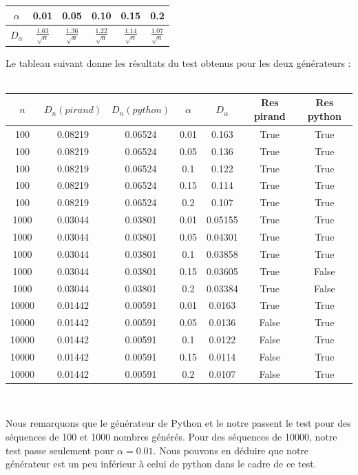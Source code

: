 \documentclass[10pt,a4paper]{article}
\begin{document}
\begin{center}
\begin{tabular}{|c|c|c|c|c|c|}
\hline
$\alpha$ &0.01& 0.05& 0.10& 0.15& 0.2\\
\hline
$D_\alpha$ & $\frac{1.63}{\sqrt{n}}$ & $\frac{1.36}{\sqrt{n}}$ & $\frac{1.22}{\sqrt{n}}$ & $\frac{1.14}{\sqrt{n}}$ & $\frac{1.07}{\sqrt{n}}$\\
\hline
\end{tabular}
\end{center}
Le tableau suivant donne les résultats du test obtenus pour les deux générateurs : \\\\
\begin{center}
\begin{tabular}{|c|c|c|c|c|c|c|}
\hline
 $n$ & $D_{n} (pirand)$ & $D_{n} (python)$ & $\alpha$ & $D_{\alpha}$ & Res pirand & Res python\\ 
\hline 
100&0.08219&0.06524 & 0.01&0.163 & True & True\\\hline 
100&0.08219&0.06524 & 0.05&0.136 & True & True\\\hline 
100&0.08219&0.06524 & 0.1&0.122 & True & True\\\hline 
100&0.08219&0.06524 & 0.15&0.114 & True & True\\\hline 
100&0.08219&0.06524 & 0.2&0.107 & True & True\\\hline 
1000&0.03044&0.03801 & 0.01&0.05155 & True & True\\\hline 
1000&0.03044&0.03801 & 0.05&0.04301 & True & True\\\hline 
1000&0.03044&0.03801 & 0.1&0.03858 & True & True\\\hline 
1000&0.03044&0.03801 & 0.15&0.03605 & True & False\\\hline 
1000&0.03044&0.03801 & 0.2&0.03384 & True & False\\\hline 
10000&0.01442&0.00591 & 0.01&0.0163 & True & True\\\hline 
10000&0.01442&0.00591 & 0.05&0.0136 & False & True\\\hline 
10000&0.01442&0.00591 & 0.1&0.0122 & False & True\\\hline 
10000&0.01442&0.00591 & 0.15&0.0114 & False & True\\\hline 
10000&0.01442&0.00591 & 0.2&0.0107 & False & True\\\hline
\end{tabular}\\
\end{center}
\bigskip
Nous remarquons que le générateur de Python et le notre passent le test pour des séquences de 100 et 1000 nombres générés. Pour des séquences de 10000, notre test passe seulement pour $\alpha = 0.01$. Nous pouvons en déduire que notre générateur est un peu inférieur à celui de python dans le cadre de ce test.
\end{document}
